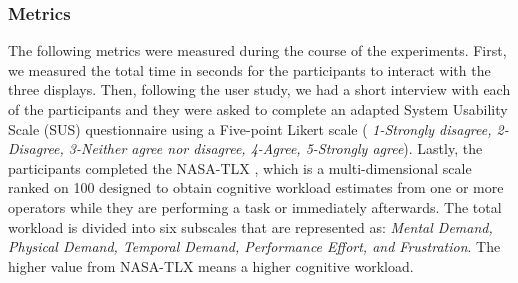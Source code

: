\subsubsection{Metrics}
The following metrics were measured during the course of the experiments. First, we measured the total time in seconds for the participants to interact with the three displays. Then, following the user study, we had a short interview with each of the participants and they were asked to complete an adapted System Usability Scale (SUS) \cite{Brooke1996b} questionnaire using a Five-point Likert scale (\textit{ 1-Strongly disagree, 2-Disagree, 3-Neither agree nor disagree, 4-Agree, 5-Strongly agree}). Lastly, the participants completed the NASA-TLX \cite{Hart2006}, which is a multi-dimensional scale ranked on 100 designed to obtain cognitive workload estimates from one or more operators while they are performing a task or immediately afterwards. The total workload is divided into six subscales that are represented as: \textit{Mental Demand, Physical Demand, Temporal Demand, Performance Effort, and Frustration}. The higher value from NASA-TLX means a higher cognitive workload.
